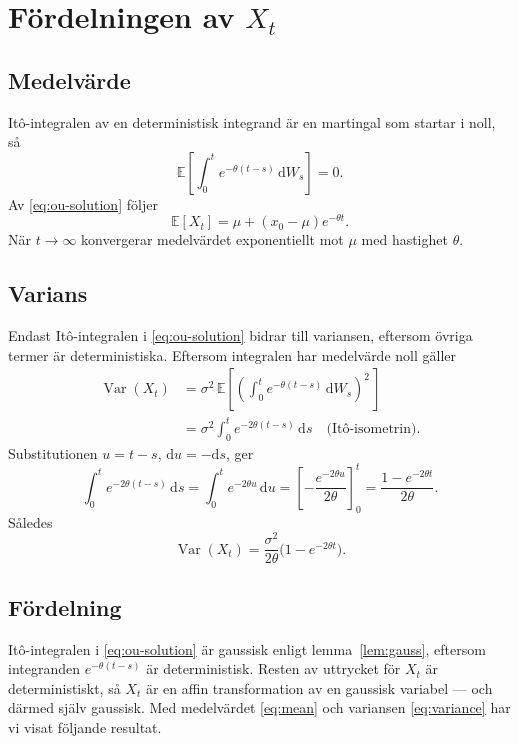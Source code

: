 \documentclass[11pt,a4paper]{article}
\newcommand{\E}{\mathbb{E}}
\newcommand{\Var}{\operatorname{Var}}
\newcommand{\dd}{\mathrm{d}}
\theoremstyle{plain}
\theoremstyle{definition}
\theoremstyle{remark}
\begin{document}
\section{Fördelningen av $X_t$}

\subsection*{Medelvärde}

Itô-integralen av en deterministisk integrand är en martingal som startar i noll, så
\[
    \E\!\left[\int_0^t e^{-\theta(t-s)}\,\dd W_s\right] = 0.
\]
Av \eqref{eq:ou-solution} följer
\begin{equation}
    \E[X_t] = \mu + (x_0 - \mu)e^{-\theta t}.
    \label{eq:mean}
\end{equation}
När $t \to \infty$ konvergerar medelvärdet exponentiellt mot $\mu$ med hastighet $\theta$.

\subsection*{Varians}

Endast Itô-integralen i \eqref{eq:ou-solution} bidrar till variansen, eftersom övriga termer är deterministiska. Eftersom integralen har medelvärde noll gäller
\begin{align}
    \Var(X_t) &= \sigma^2 \,\E\!\left[\left(\int_0^t e^{-\theta(t-s)}\,\dd W_s\right)^{\!2}\,\right] \nonumber \\
    &= \sigma^2 \int_0^t e^{-2\theta(t-s)}\,\dd s \quad\text{(Itô-isometrin)}.
\end{align}
Substitutionen $u = t - s$, $\dd u = -\dd s$, ger
\[
    \int_0^t e^{-2\theta(t-s)}\,\dd s = \int_0^t e^{-2\theta u}\,\dd u = \left[-\frac{e^{-2\theta u}}{2\theta}\right]_0^t = \frac{1 - e^{-2\theta t}}{2\theta}.
\]
Således
\begin{equation}
    \boxed{\Var(X_t) = \frac{\sigma^2}{2\theta}\bigl(1 - e^{-2\theta t}\bigr).}
    \label{eq:variance}
\end{equation}

\subsection*{Fördelning}

Itô-integralen i \eqref{eq:ou-solution} är gaussisk enligt lemma~\ref{lem:gauss}, eftersom integranden $e^{-\theta(t-s)}$ är deterministisk. Resten av uttrycket för $X_t$ är deterministiskt, så $X_t$ är en affin transformation av en gaussisk variabel --- och därmed själv gaussisk. Med medelvärdet \eqref{eq:mean} och variansen \eqref{eq:variance} har vi visat följande resultat.
\end{document}
